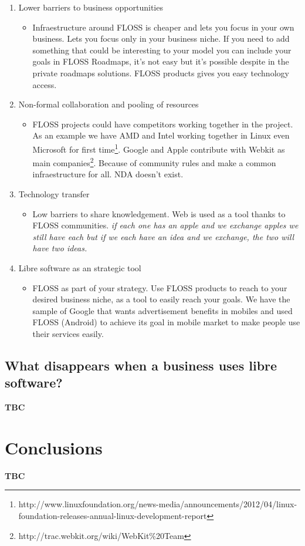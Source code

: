 \begin{enumerate}
    \item Lower barriers to business opportunities
    \begin{itemize}
        \item Infraestructure around FLOSS is cheaper and lets you focus in your own business. Lets you focus only in your business niche. If you need to add something that could be interesting to your model you can include your goals in FLOSS Roadmaps, it's not easy but it's possible despite in the private roadmaps solutions. FLOSS products gives you easy technology access.
    \end{itemize}

    \item Non-formal collaboration and pooling of resources
    \begin{itemize}
        \item FLOSS projects could have competitors working together in the project. As an example we have AMD and Intel working together in Linux even Microsoft for first time\footnote{http://www.linuxfoundation.org/news-media/announcements/2012/04/linux-foundation-releases-annual-linux-development-report}. Google and Apple contribute with Webkit as main companies\footnote{http://trac.webkit.org/wiki/WebKit\%20Team}. Because of community rules and make a common infraestructure for all. NDA doesn't exist.
    \end{itemize}

    \item Technology transfer
    \begin{itemize}
        \item Low barriers to share knowledgement. Web is used as a tool thanks to FLOSS communities. \emph{if each one has an apple and we exchange apples we still have each but if we each have an idea and we exchange, the two will have two ideas.}
    \end{itemize}

    \item Libre software as an strategic tool
    \begin{itemize}
        \item FLOSS as part of your strategy. Use FLOSS products to reach to your desired business niche, as a tool to easily reach your goals. We have the sample of Google that wants advertisement benefits in mobiles and used FLOSS (Android) to achieve its goal in mobile market to make people use their services easily.
    \end{itemize}

\end{enumerate}

\subsection{What disappears when a business uses libre software?}

\textbf{TBC}

\section{Conclusions}\label{conclusions}

\textbf{TBC}
